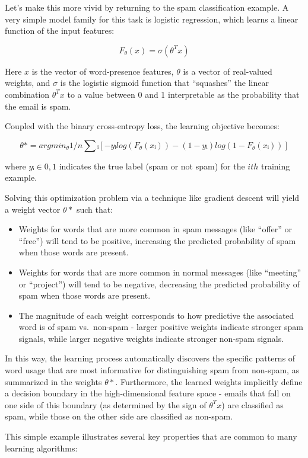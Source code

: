 \documentclass[
  9pt,
  letterpaper,
  abstract,
  titlepage]{scrbook}
\begin{document}
Let's make this more vivid by returning to the spam classification
example. A very simple model family for this task is logistic
regression, which learns a linear function of the input features:

\[F_θ(x) = σ(θ^T x)\]

Here \(x\) is the vector of word-presence features, \(θ\) is a vector of
real-valued weights, and \(σ\) is the logistic sigmoid function that
``squashes'' the linear combination \(θ^T x\) to a value between 0 and 1
interpretable as the probability that the email is spam.

Coupled with the binary cross-entropy loss, the learning objective
becomes:

\[θ* = argmin_θ 1/n ∑ᵢ [- yᵢ log(F_θ(xᵢ)) - (1 - yᵢ) log(1 - F_θ(xᵢ))]\]

where \(yᵢ ∈ {0,1}\) indicates the true label (spam or not spam) for the
\(ith\) training example.

Solving this optimization problem via a technique like gradient descent
will yield a weight vector \(θ*\) such that:

\begin{itemize}
\item
  Weights for words that are more common in spam messages (like
  ``offer'' or ``free'') will tend to be positive, increasing the
  predicted probability of spam when those words are present.
\item
  Weights for words that are more common in normal messages (like
  ``meeting'' or ``project'') will tend to be negative, decreasing the
  predicted probability of spam when those words are present.
\item
  The magnitude of each weight corresponds to how predictive the
  associated word is of spam vs.~non-spam - larger positive weights
  indicate stronger spam signals, while larger negative weights indicate
  stronger non-spam signals.
\end{itemize}

In this way, the learning process automatically discovers the specific
patterns of word usage that are most informative for distinguishing spam
from non-spam, as summarized in the weights \(θ*\). Furthermore, the
learned weights implicitly define a decision boundary in the
high-dimensional feature space - emails that fall on one side of this
boundary (as determined by the sign of \(θ^T x\)) are classified as
spam, while those on the other side are classified as non-spam.

This simple example illustrates several key properties that are common
to many learning algorithms:
\end{document}

